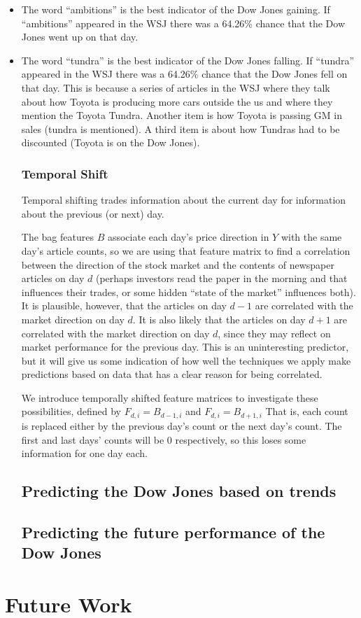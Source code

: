 \documentclass[10pt]{article}
\begin{document}
\begin{itemize}
\item The word ``ambitions'' is the best indicator of the Dow Jones gaining. If ``ambitions'' appeared in the WSJ there was a 64.26\% chance that the Dow Jones went up on that day.
\item The word ``tundra'' is the best indicator of the Dow Jones falling. If ``tundra'' appeared in the WSJ there was a 64.26\% chance that the Dow Jones fell on that day. This is because a series of articles in the WSJ where they talk about how Toyota is producing more cars outside the us and where they mention the Toyota Tundra. Another item is how Toyota is passing GM in sales (tundra is mentioned). A third item is about how Tundras had to be discounted (Toyota is on the Dow Jones).


\subsubsection*{Temporal Shift}
Temporal shifting trades information about the current day for information about the previous (or next) day.


The bag features $B$ associate each day's price direction in $Y$ with the same day's article counts, so we are using that feature matrix to find a correlation between the direction of the stock market and the contents of newspaper articles on day $d$ (perhaps investors read the paper in the morning and that influences their trades, or some hidden ``state of the market'' influences both). It is plausible, however, that the articles on day $d-1$ are correlated with the market direction on day $d$. It is also likely that the articles on day $d+1$ are correlated with the market direction on day $d$, since they may reflect on market performance for the previous day. This is an uninteresting predictor, but it will give us some indication of how well the techniques we apply make predictions based on data that has a clear reason for being correlated.

We introduce temporally shifted feature matrices to investigate these possibilities, defined by $F_{d,i} = B_{d-1,i}$ and $F_{d,i} = B_{d+1,i}$ That is, each count is replaced either by the previous day's count or the next day's count. The first and last days' counts will be 0 respectively, so this loses some information for one day each.

\subsection{Predicting the Dow Jones based on trends}
\label{dj->dj}

\subsection{Predicting the future performance of the Dow Jones}
\label{predict-dj}

\end{itemize}

\section{Future Work}



\end{document}
